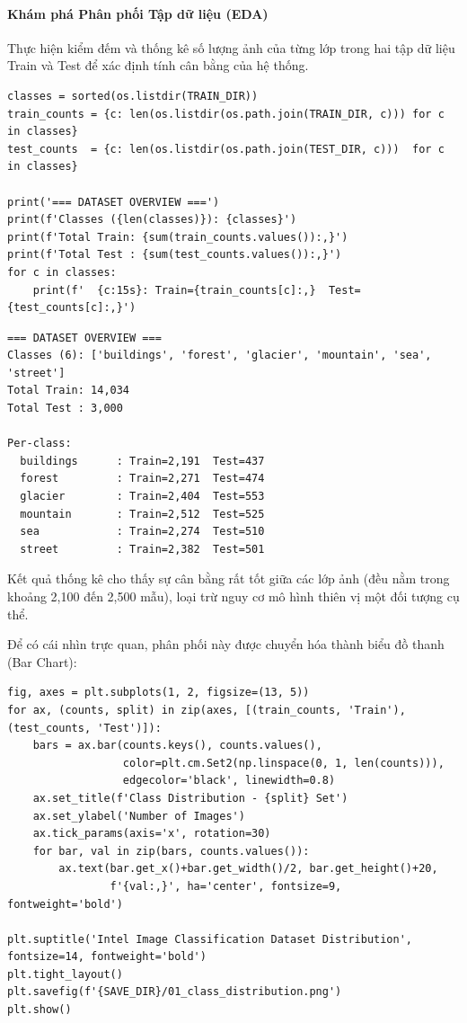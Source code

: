 \paragraph{Khám phá Phân phối Tập dữ liệu (EDA)} \hfill\mbox{}

Thực hiện kiểm đếm và thống kê số lượng ảnh của từng lớp trong hai tập dữ liệu Train và Test để xác định tính cân bằng của hệ thống.

\begin{lstlisting}[style=pythoncode, caption={Đếm số lượng mẫu trong từng Class}]
classes = sorted(os.listdir(TRAIN_DIR))
train_counts = {c: len(os.listdir(os.path.join(TRAIN_DIR, c))) for c in classes}
test_counts  = {c: len(os.listdir(os.path.join(TEST_DIR, c)))  for c in classes}

print('=== DATASET OVERVIEW ===')
print(f'Classes ({len(classes)}): {classes}')
print(f'Total Train: {sum(train_counts.values()):,}')
print(f'Total Test : {sum(test_counts.values()):,}')
for c in classes:
    print(f'  {c:15s}: Train={train_counts[c]:,}  Test={test_counts[c]:,}')
\end{lstlisting}

\begin{lstlisting}[style=consoleoutput, caption={Output: Tổng quan Dataset}]
=== DATASET OVERVIEW ===
Classes (6): ['buildings', 'forest', 'glacier', 'mountain', 'sea', 'street']
Total Train: 14,034
Total Test : 3,000

Per-class:
  buildings      : Train=2,191  Test=437
  forest         : Train=2,271  Test=474
  glacier        : Train=2,404  Test=553
  mountain       : Train=2,512  Test=525
  sea            : Train=2,274  Test=510
  street         : Train=2,382  Test=501
\end{lstlisting}

Kết quả thống kê cho thấy sự cân bằng rất tốt giữa các lớp ảnh (đều nằm trong khoảng 2,100 đến 2,500 mẫu), loại trừ nguy cơ mô hình thiên vị một đối tượng cụ thể.

Để có cái nhìn trực quan, phân phối này được chuyển hóa thành biểu đồ thanh (Bar Chart):

\begin{lstlisting}[style=pythoncode, caption={Vẽ biểu đồ phân phối các Class}]
fig, axes = plt.subplots(1, 2, figsize=(13, 5))
for ax, (counts, split) in zip(axes, [(train_counts, 'Train'), (test_counts, 'Test')]):
    bars = ax.bar(counts.keys(), counts.values(),
                  color=plt.cm.Set2(np.linspace(0, 1, len(counts))),
                  edgecolor='black', linewidth=0.8)
    ax.set_title(f'Class Distribution - {split} Set')
    ax.set_ylabel('Number of Images')
    ax.tick_params(axis='x', rotation=30)
    for bar, val in zip(bars, counts.values()):
        ax.text(bar.get_x()+bar.get_width()/2, bar.get_height()+20,
                f'{val:,}', ha='center', fontsize=9, fontweight='bold')

plt.suptitle('Intel Image Classification Dataset Distribution', fontsize=14, fontweight='bold')
plt.tight_layout()
plt.savefig(f'{SAVE_DIR}/01_class_distribution.png')
plt.show()
\end{lstlisting}

